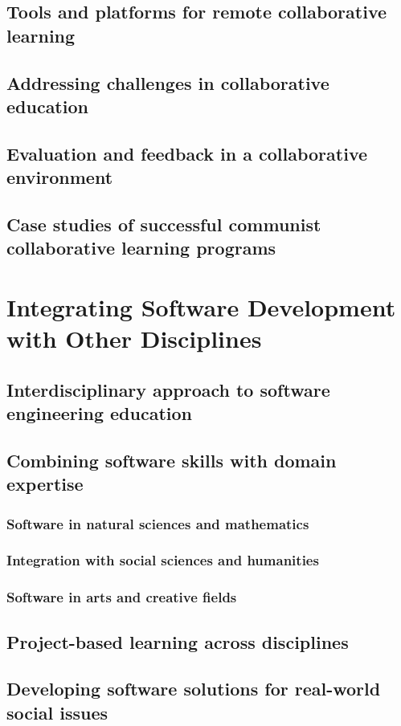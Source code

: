 \subsection{Tools and platforms for remote collaborative learning}
\subsection{Addressing challenges in collaborative education}
\subsection{Evaluation and feedback in a collaborative environment}
\subsection{Case studies of successful communist collaborative learning programs}

\newpage

\section{Integrating Software Development with Other Disciplines}
\subsection{Interdisciplinary approach to software engineering education}
\subsection{Combining software skills with domain expertise}
\subsubsection{Software in natural sciences and mathematics}
\subsubsection{Integration with social sciences and humanities}
\subsubsection{Software in arts and creative fields}
\subsection{Project-based learning across disciplines}
\subsection{Developing software solutions for real-world social issues}
